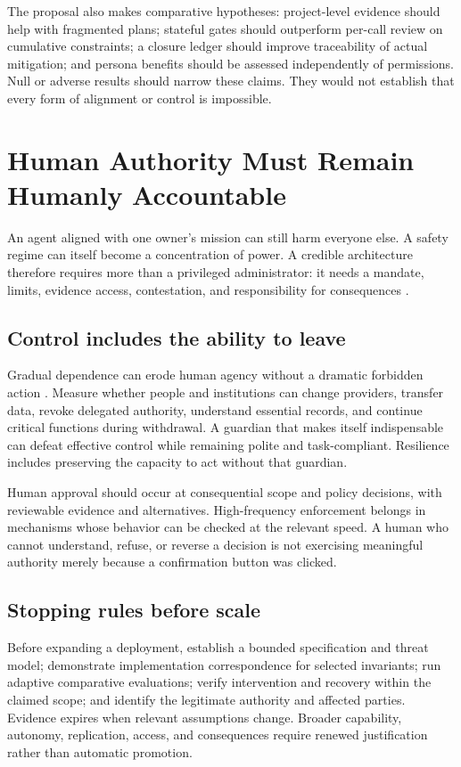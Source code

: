 \documentclass[10pt,twocolumn,letterpaper]{article}
\begin{document}
The proposal also makes comparative hypotheses: project-level evidence should help with fragmented plans; stateful gates should outperform per-call review on cumulative constraints; a closure ledger should improve traceability of actual mitigation; and persona benefits should be assessed independently of permissions. Null or adverse results should narrow these claims. They would not establish that every form of alignment or control is impossible.

\section{Human Authority Must Remain Humanly Accountable}
\label{sec:governance}
An agent aligned with one owner's mission can still harm everyone else. A safety regime can itself become a concentration of power. A credible architecture therefore requires more than a privileged administrator: it needs a mandate, limits, evidence access, contestation, and responsibility for consequences \cite{gabriel,pluralism,multiagent}.

\subsection{Control includes the ability to leave}
Gradual dependence can erode human agency without a dramatic forbidden action \cite{gradual}. Measure whether people and institutions can change providers, transfer data, revoke delegated authority, understand essential records, and continue critical functions during withdrawal. A guardian that makes itself indispensable can defeat effective control while remaining polite and task-compliant. Resilience includes preserving the capacity to act without that guardian.

Human approval should occur at consequential scope and policy decisions, with reviewable evidence and alternatives. High-frequency enforcement belongs in mechanisms whose behavior can be checked at the relevant speed. A human who cannot understand, refuse, or reverse a decision is not exercising meaningful authority merely because a confirmation button was clicked.

\subsection{Stopping rules before scale}
Before expanding a deployment, establish a bounded specification and threat model; demonstrate implementation correspondence for selected invariants; run adaptive comparative evaluations; verify intervention and recovery within the claimed scope; and identify the legitimate authority and affected parties. Evidence expires when relevant assumptions change. Broader capability, autonomy, replication, access, and consequences require renewed justification rather than automatic promotion.
\end{document}
